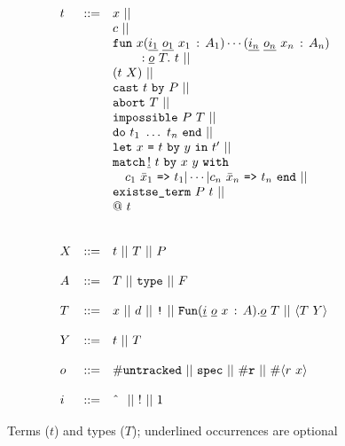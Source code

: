 \documentclass[9pt,natbib]{sigplanconf}
\newcommand{\Eq}[0]{\texttt{=}}
\newcommand{\bang}[0]{\texttt{!}}
\begin{document}
\begin{figure}
\[
\begin{array}{lll}
t & ::= & x\ || \\
\ & \ &   c\ ||\\ 
\ & \ &    \texttt{fun}\ x(\underline{i_1}\ \underline{o_1}\ x_1\,:\,A_1)\cdots(\underline{i_n}\ \underline{o_n}\ x_n\,:\, A_n)\\
\ & \ & \ \ \ \ \ \ \  : \underline{o}\ T .\ t\ ||\\
\ & \ &    (t\ X)\ || \\ 
\ & \ &         \texttt{cast}\ t\ \texttt{by}\ P  \ ||\\
\ & \ &  \texttt{abort}\ T\ ||\\ 
\ & \ &  \texttt{impossible}\ P\ T\ ||\\ 
\ & \ &  \texttt{do}\ t_1\ \ldots\ t_n\ \texttt{end}\ ||\\ 
\ & \ &  \texttt{let}\ x\ \Eq\ t\ \texttt{by}\ y\ \texttt{in}\ t' \ ||\ 
\\ 
\ & \ &  \texttt{match}\, \underline{!}\ t\ \texttt{by}\ x\ y \ \texttt{with}\\
\ & \ &  \ \ \ c_1\ \bar{x}_1\ \texttt{=>}\ t_1 |
 \cdots | c_n\ \bar{x}_n\ \texttt{=>}\ t_n\ \texttt{end}\ ||\\
\ & \ &  \texttt{existse\_term}\ P\ t\ || \\
\ & \ &  @\ t \\
\\
\\
X & ::= & t\ ||\ T\ ||\ P
\\
\\
A & ::= & T\ ||\ \texttt{type}\ ||\ F 
\\
\\
T & ::= & x\ ||\ d\ ||\ \bang\ ||\ 
     \texttt{Fun}(\underline{i}\ \underline{o}\ x\,:\,A) . \underline{o}\ T\ ||\ \langle T\ Y\rangle 
\\
\\
Y & ::= & t\ ||\ T
\\
\\
o & ::= & \#\texttt{untracked}\ ||\ \texttt{spec}\ ||\ \#\texttt{r}\ ||\ \#\langle r\ x\rangle
\\
\\
i & ::= & \textnormal{\^{\ }}\ ||\ !\ ||\ 1
\end{array}
\]
\caption{\label{fig:terms} Terms ($t$) and types ($T$); underlined occurrences are optional}
\end{figure}
\end{document}
